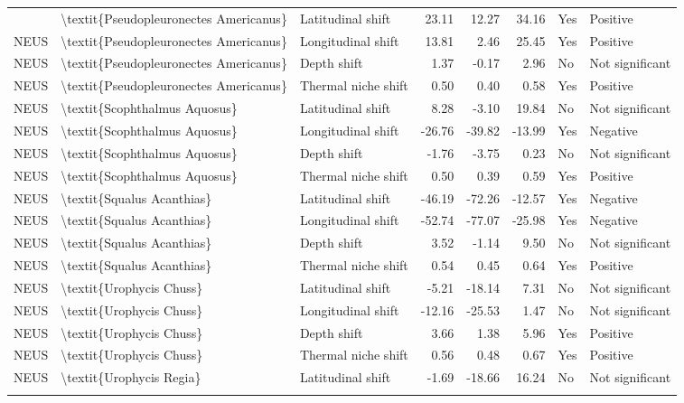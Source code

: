 \begin{longtable}[t]{lllrrrll}
{{NEUS & \textbackslash{}textit\{Pseudopleuronectes Americanus\} & Latitudinal shift & 23.11 & 12.27 & 34.16 & Yes & Positive\\
NEUS & \textbackslash{}textit\{Pseudopleuronectes Americanus\} & Longitudinal shift & 13.81 & 2.46 & 25.45 & Yes & Positive\\
NEUS & \textbackslash{}textit\{Pseudopleuronectes Americanus\} & Depth shift & 1.37 & -0.17 & 2.96 & No & Not significant\\
\addlinespace
NEUS & \textbackslash{}textit\{Pseudopleuronectes Americanus\} & Thermal niche shift & 0.50 & 0.40 & 0.58 & Yes & Positive\\
NEUS & \textbackslash{}textit\{Scophthalmus Aquosus\} & Latitudinal shift & 8.28 & -3.10 & 19.84 & No & Not significant\\
NEUS & \textbackslash{}textit\{Scophthalmus Aquosus\} & Longitudinal shift & -26.76 & -39.82 & -13.99 & Yes & Negative\\
NEUS & \textbackslash{}textit\{Scophthalmus Aquosus\} & Depth shift & -1.76 & -3.75 & 0.23 & No & Not significant\\
NEUS & \textbackslash{}textit\{Scophthalmus Aquosus\} & Thermal niche shift & 0.50 & 0.39 & 0.59 & Yes & Positive\\
\addlinespace
NEUS & \textbackslash{}textit\{Squalus Acanthias\} & Latitudinal shift & -46.19 & -72.26 & -12.57 & Yes & Negative\\
NEUS & \textbackslash{}textit\{Squalus Acanthias\} & Longitudinal shift & -52.74 & -77.07 & -25.98 & Yes & Negative\\
NEUS & \textbackslash{}textit\{Squalus Acanthias\} & Depth shift & 3.52 & -1.14 & 9.50 & No & Not significant\\
NEUS & \textbackslash{}textit\{Squalus Acanthias\} & Thermal niche shift & 0.54 & 0.45 & 0.64 & Yes & Positive\\
NEUS & \textbackslash{}textit\{Urophycis Chuss\} & Latitudinal shift & -5.21 & -18.14 & 7.31 & No & Not significant\\
\addlinespace
NEUS & \textbackslash{}textit\{Urophycis Chuss\} & Longitudinal shift & -12.16 & -25.53 & 1.47 & No & Not significant\\
NEUS & \textbackslash{}textit\{Urophycis Chuss\} & Depth shift & 3.66 & 1.38 & 5.96 & Yes & Positive\\
NEUS & \textbackslash{}textit\{Urophycis Chuss\} & Thermal niche shift & 0.56 & 0.48 & 0.67 & Yes & Positive\\
NEUS & \textbackslash{}textit\{Urophycis Regia\} & Latitudinal shift & -1.69 & -18.66 & 16.24 & No & Not significant\\
}}
\end{longtable}
